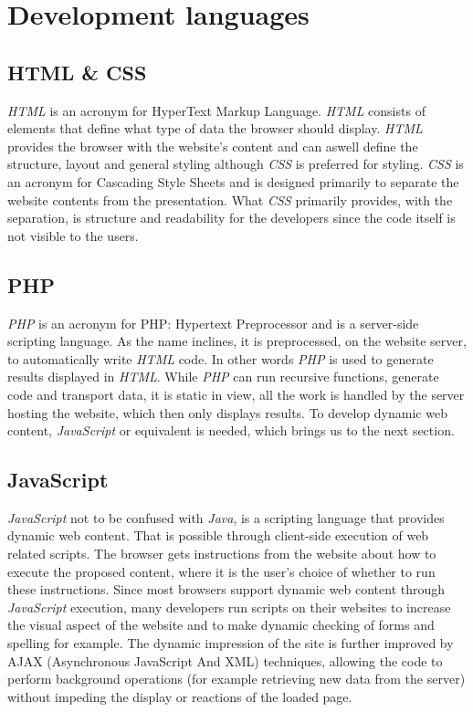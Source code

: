 \section{Development languages}

\subsection{HTML \& CSS}
\label{program_tools_html_css}
\textit{HTML} is an acronym for HyperText Markup Language. \textit{HTML} consists of elements that define what type of data the browser should display. \textit{HTML} provides the browser with the website's content and can aswell define the structure, layout and general styling although \textit{CSS} is preferred for styling. \textit{CSS} is an acronym for Cascading Style Sheets and is designed primarily to separate the website contents from the presentation.
What \textit{CSS} primarily provides, with the separation, is structure and readability for the developers since the code itself is not visible to the users.\cite{html}\cite{css}

\subsection{PHP}
\textit{PHP} is an acronym for PHP: Hypertext Preprocessor and is a server-side scripting language. As the name inclines, it is preprocessed, on the website server, to automatically write \textit{HTML} code. In other words \textit{PHP} is used to generate results displayed in \textit{HTML}. While \textit{PHP} can run recursive functions, generate code and transport data, it is static in view, all the work is handled by the server hosting the website, which then only displays results. To develop dynamic web content, \textit{JavaScript} or equivalent is needed, which brings us to the next section.\cite{php}

\subsection{JavaScript}
\textit{JavaScript} not to be confused with \textit{Java}, is a scripting language that provides dynamic web content. That is possible through client-side execution of web related scripts. The browser gets instructions from the website about how to execute the proposed content, where it is the user's choice of whether to run these instructions.
Since most browsers support dynamic web content through \textit{JavaScript} execution, many developers run scripts on their websites to increase the visual aspect of the website and to make dynamic checking of forms and spelling for example.\cite{javascript} The dynamic impression of the site is further improved by AJAX (Asynchronous JavaScript And XML) techniques, allowing the code to perform background operations (for example retrieving new data from the server) without impeding the display or reactions of the loaded page.

